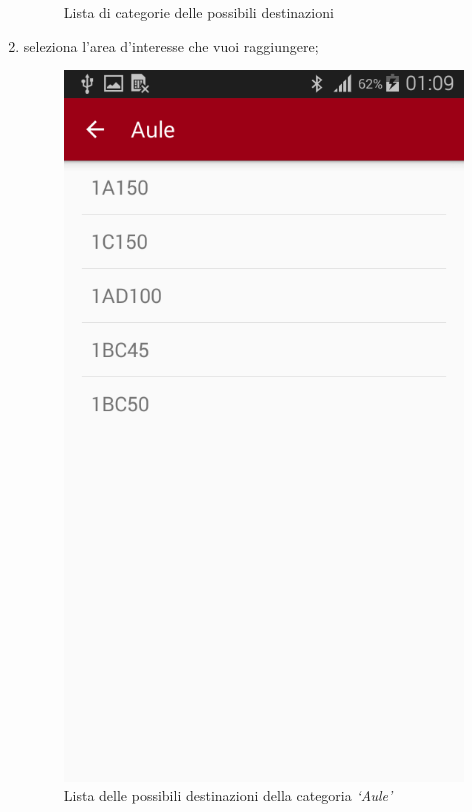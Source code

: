 \documentclass[../ClipsManualeUtente.tex]{subfiles}
\begin{document}
\begin{enumerate}
		\begin{figure} [h]
			\centering
			\caption{Lista di categorie delle possibili destinazioni}
			\label{fig:CategoriePoi}
		\end{figure}	
		
		\newpage
		\item seleziona l'area d'interesse che vuoi raggiungere;
		
		\begin{figure} [h]
			\centering
			\includegraphics[scale=0.2]{img/ListaPoi}
			\caption{Lista delle possibili destinazioni della categoria \textit{`Aule'}}
			\label{fig:ListaPoi}
		\end{figure}				
		

\end{enumerate}
\end{document}
